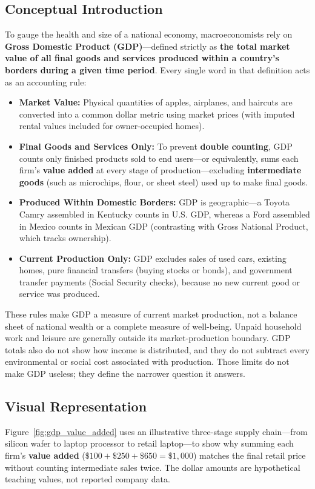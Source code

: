 \documentclass[11pt,letterpaper]{article}
\begin{document}
\subsection*{Conceptual Introduction}
To gauge the health and size of a national economy, macroeconomists rely on \textbf{Gross Domestic Product (GDP)}—defined strictly as \textbf{the total market value of all final goods and services produced within a country's borders during a given time period}. Every single word in that definition acts as an accounting rule:
\begin{itemize}
    \item \textbf{Market Value:} Physical quantities of apples, airplanes, and haircuts are converted into a common dollar metric using market prices (with imputed rental values included for owner-occupied homes).
    \item \textbf{Final Goods and Services Only:} To prevent \textbf{double counting}, GDP counts only finished products sold to end users—or equivalently, sums each firm's \textbf{value added} at every stage of production—excluding \textbf{intermediate goods} (such as microchips, flour, or sheet steel) used up to make final goods.
    \item \textbf{Produced Within Domestic Borders:} GDP is geographic—a Toyota Camry assembled in Kentucky counts in U.S. GDP, whereas a Ford assembled in Mexico counts in Mexican GDP (contrasting with Gross National Product, which tracks ownership).
    \item \textbf{Current Production Only:} GDP excludes sales of used cars, existing homes, pure financial transfers (buying stocks or bonds), and government transfer payments (Social Security checks), because no new current good or service was produced.
\end{itemize}

These rules make GDP a measure of current market production, not a balance sheet of national wealth or a complete measure of well-being. Unpaid household work and leisure are generally outside its market-production boundary. GDP totals also do not show how income is distributed, and they do not subtract every environmental or social cost associated with production. Those limits do not make GDP useless; they define the narrower question it answers.

\subsection*{Visual Representation}
Figure~\ref{fig:gdp_value_added} uses an illustrative three-stage supply chain—from silicon wafer to laptop processor to retail laptop—to show why summing each firm's \textbf{value added} ($\$100 + \$250 + \$650 = \$1{,}000$) matches the final retail price without counting intermediate sales twice. The dollar amounts are hypothetical teaching values, not reported company data.
\end{document}
